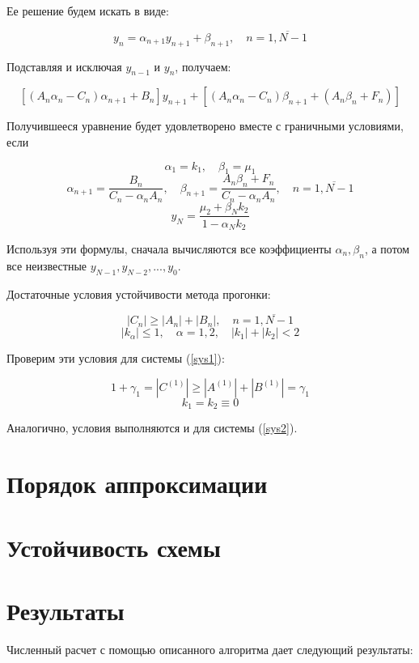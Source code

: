 \documentclass[12pt]{article}
\begin{document}
			Ее решение будем искать в виде:
			
			$$y_n  = \alpha_{n+1} y_{n+1} + \beta_{n+1}, \quad n = \overline{1, N-1}$$
			
			Подставляя и исключая $y_{n-1}$ и $y_n$, получаем:
			
			$$[(A_n \alpha_n - C_n)\alpha_{n+1} + B_n]y_{n+1} + [(A_n \alpha_n - C_n)\beta_{n+1} + (A_n \beta_n + F_n)]$$
			
			Получившееся уравнение будет удовлетворено вместе с граничными условиями, если
			
			$$\alpha_1 = k_1, \quad \beta_1 = \mu_1$$
			$$\alpha_{n+1} = \frac{B_n}{C_n - \alpha_n A_n}, \quad \beta_{n+1} = \frac{A_n \beta_n + F_n}{C_n - \alpha_n A_n}, \quad n = \overline{1, N-1}$$
			$$y_N = \frac{\mu_2 + \beta_N k_2}{1 - \alpha_N k_2}$$
			
			Используя эти формулы, сначала вычисляются все коэффициенты $\alpha_n, \beta_n$, а потом все неизвестные $y_{N-1}, y_{N-2}, ..., y_0$.
			
			Достаточные условия устойчивости метода прогонки:
			
			$$|C_n| \ge |A_n| + |B_n|, \quad n = \overline{1, N-1}$$
			$$|k_\alpha| \le 1, \quad \alpha = 1, 2, \quad |k_1| + |k_2| < 2$$
			
			Проверим эти условия для системы (\ref{sys1}):
			
			$$1 + \gamma_1 = |C^{(1)}| \ge |A^{(1)}| + |B^{(1)}| = \gamma_1$$
			$$k_1 = k_2 \equiv 0$$
			
			Аналогично, условия выполняются и для системы (\ref{sys2}).
			
	\section{Порядок аппроксимации}
	
	\section{Устойчивость схемы}
	
	\section{Результаты}
		Численный расчет с помощью описанного алгоритма дает следующий результаты:
		
\end{document}
